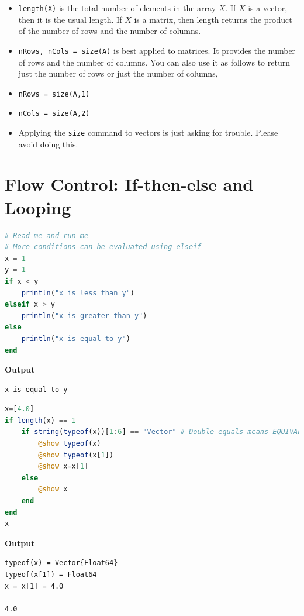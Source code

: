 \vspace*{.2cm}

\begin{tcolorbox}[title = {\bf \large Length vs Size}]

\begin{itemize}
    \item \texttt{length(X)} is the total number of elements in the array $X$. If $X$ is a vector, then it is the usual length. If $X$ is a matrix, then length returns the product of the number of rows and the number of columns.
    
    \item \texttt{nRows, nCols = size(A)} is best applied to matrices. It provides the number of rows and the number of columns. You can also use it as follows to return just the number of rows or just the number of columns,
    
    \item \texttt{nRows = size(A,1)}
    
  \item \texttt{nCols = size(A,2)} 
  
  \item Applying the \texttt{size} command to vectors is just asking for trouble. Please avoid doing this.
\end{itemize}


\end{tcolorbox}


\section{Flow Control: If-then-else and Looping}
\label{sec:AppendixA:FlowControl}

\begin{lstlisting}[language=Julia,style=mystyle]
# Read me and run me
# More conditions can be evaluated using elseif
x = 1
y = 1
if x < y
    println("x is less than y")
elseif x > y
    println("x is greater than y")
else
    println("x is equal to y")
end
\end{lstlisting}
\textbf{Output} 
\begin{verbatim}
x is equal to y
\end{verbatim}



\begin{lstlisting}[language=Julia,style=mystyle]
x=[4.0]
if length(x) == 1
    if string(typeof(x))[1:6] == "Vector" # Double equals means EQUIVALENT TO
        @show typeof(x)
        @show typeof(x[1])
        @show x=x[1]
    else
        @show x
    end
end
x
\end{lstlisting}
\textbf{Output} 
\begin{verbatim}
typeof(x) = Vector{Float64}
typeof(x[1]) = Float64
x = x[1] = 4.0

4.0
\end{verbatim}


